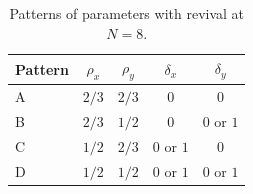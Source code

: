 \begin{table}[htbp]
\centering
\caption{Patterns of parameters with revival at $N=8$.}
\label{tab:period8}
\begin{tabular}{lcccc}
\toprule
Pattern & $\rho_x$ & $\rho_y$ & $\delta_x$ & $\delta_y$ \\
\midrule
A & $2/3$ & $2/3$ & $0$ & $0$ \\
B & $2/3$ & $1/2$ & $0$ & $0$ or $1$ \\
C & $1/2$ & $2/3$ & $0$ or $1$ & $0$ \\
D & $1/2$ & $1/2$ & $0$ or $1$ & $0$ or $1$ \\
\bottomrule
\end{tabular}
\end{table}
